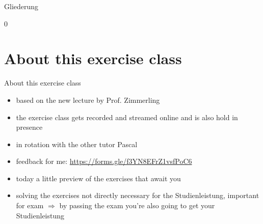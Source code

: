 \def\pascal{0}
\def\preview{0}









\begin{withoutheadline}
  \begin{withoutfootline}
    \begin{frame}
      \titlepagesecond
    \end{frame}
  \end{withoutfootline}

  \begin{frame}{Gliederung}
    \tableofcontents[hideallsubsections]
  \end{frame}
\end{withoutheadline}

\if\pascal0{
\section{About this exercise class}

\begin{frame}{About this exercise class}{}
  \begin{itemize}
    \item based on the \alert{new} lecture by Prof. Zimmerling
    \item the exercise class gets \alert{recorded} and \alert{streamed online} and is also hold in \alert{presence}
    \item in \alert{rotation} with the other tutor \alert{Pascal}
    \item \alert{feedback for me:} \url{https://forms.gle/f3YN8EFrZ1vsfPoC6}
    \item today a little \alert{preview} of the exercises that await you
    \item solving the exercises \alert{not} directly \alert{necessary} for the \alert{Studienleistung}, important for exam $\Rightarrow$ by passing the exam you're also going to get your \alert{Studienleistung}
  \end{itemize}
\end{frame}
}
\fi







